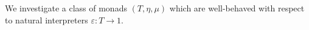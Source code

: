 We investigate a class of monads \(\left(T, \eta, \mu\right)\) which are well-behaved with respect to natural interpreters \(\varepsilon : T \rightarrow 1\).
